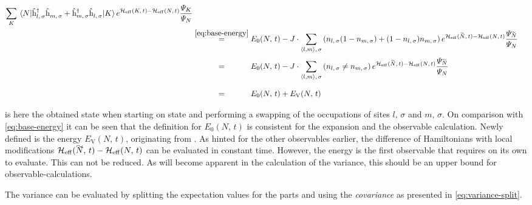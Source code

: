 \begin{equation}
\begin{split}
        \lsum[K] \bracketHelper{N}{ \withspinhcop{l}{\sigma}{\dagger} \withspinhcop{m}{\sigma}{} + \withspinhcop{m}{\sigma}{\dagger} \withspinhcop{l}{\sigma}{} }{K} e^{\HeffOft[K]-\HeffOft[N]}
        \frac{
            \psiN[K]
        }{
            \psiN[N]
        }\\
        &\stackrel{\ref{eq:base-energy}}{=} E_0(N,\,t)-
        J \cdot \neighborsumWSpin{l}{m}{\sigma}
        \left(n_{l,\,\sigma} (1- n_{m,\,\sigma}) + (1-n_{l,\,\sigma}) n_{m,\,\sigma}\right)
         e^{\HeffOft[\vphantom{N}\smash{\tilde{N}}]-\HeffOft[N]}
        \frac{
            \psiN[\vphantom{N}\smash{\tilde{N}}]
        }{
            \psiN[N]
        }\\
        &\stackrel{\phantom{\ref{eq:base-energy}}}{=} E_0(N,\,t)-
        J \cdot \neighborsumWSpin{l}{m}{\sigma}
        \left(n_{l,\,\sigma} \neq n_{m,\,\sigma}\right)
         e^{\HeffOft[\vphantom{N}\smash{\tilde{N}}]-\HeffOft[N]}
        \frac{
            \psiN[\vphantom{N}\smash{\tilde{N}}]
        }{
            \psiN[N]
        }\\
        &\stackrel{\phantom{\ref{eq:base-energy}}}{=} E_0(N,\,t) + E_\text{V}(N,\,t)
    \end{split}
\end{equation}

 is here the obtained state when starting on state \ketN and performing a swapping of the occupations of sites $l,\,\sigma$ and $m,\,\sigma$.
On comparison with \autoref{eq:base-energy} it can be seen that the definition for $E_0(N,\,t)$ is consistent for the expansion and the observable calculation.
Newly defined is the energy $E_\text{V}(N,\,t)$, originating from \Vhamiltonian[].
As hinted for the other observables earlier, the difference of Hamiltonians with local modifications $\HeffOft[\vphantom{N}\smash{\tilde{N}}]-\HeffOft[N]$ can be evaluated in constant time.
However, the energy is the first observable that requires  on its own to evaluate. This can not be reduced. As will become apparent in the calculation of the variance, this should be an upper bound for observable-calculations.

The variance can be evaluated by splitting the expectation values for the parts \HzeroHamiltonian[\schroedingerPicture] and \Vhamiltonian[\schroedingerPicture] using the \emph{covariance} as presented in \autoref{eq:variance-split}.

